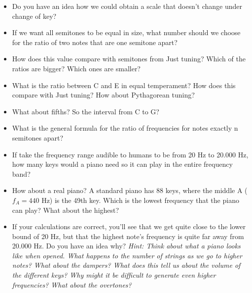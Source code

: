 \documentclass[a4paper, 11pt]{article}
\begin{document}
\begin{itemize}
    \item Do you have an idea how we could obtain a scale that doesn't change under change of key?
    \item If we want all semitones to be equal in size, what number should we choose for the ratio of two notes that are one semitone apart?
    \item How does this value compare with semitones from Just tuning? Which of the ratios are bigger? Which ones are smaller?
    \item What is the ratio between C and E in equal temperament? How does this compare with Just tuning? How about Pythagorean tuning? 
    \item What about fifths? So the interval from C to G?
    \item What is the general formula for the ratio of frequencies for notes exactly n semitones apart?
    \item If take the frequency range audible to humans to be from 20 Hz to 20.000 Hz, how many keys would a piano need so it can play in the entire frequency band?
    \item How about a real piano? A standard piano has 88 keys, where the middle A ($f_A = 440$ Hz) is the 49th key. Which is the lowest frequency that the piano can play? What about the highest?
    \item If your calculations are correct, you'll see that we get quite close to the lower bound of 20 Hz, but that the highest note's frequency is quite far away from 20.000 Hz. Do you have an idea why? \textit{Hint: Think about what a piano looks like when opened. What happens to the number of strings as we go to higher notes? What about the dampers? What does this tell us about the volume of the different keys? Why might it be difficult to generate even higher frequencies? What about the overtones?} 
\end{itemize}
\end{document}
